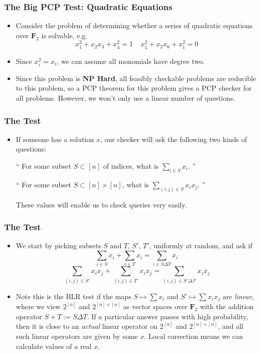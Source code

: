 \documentclass{beamer}
\begin{document}
\begin{frame}
    \frametitle{The Big PCP Test: Quadratic Equations}

    \begin{itemize}
        \item Consider the problem of determining whether a series of quadratic equations over $\mathbf{F}_2$ is solvable, e.g.
        \[ x_1^2 + x_2x_3 + x_4^2 = 1\ \ \ \ \ x_5^2 + x_2x_6 + x_1^2 = 0 \]

        \item Since $x_i^2 = x_i$, we can assume all monomials have degree two.

        \item Since this problem is {\bf NP Hard}, all feasibly checkable problems are reducible to this problem, so a PCP theorem for this problem gives a PCP checker for all problems. However, we won't only use a linear number of questions.
    \end{itemize}
\end{frame}

\begin{frame}
    \frametitle{The Test}

    \begin{itemize}
        \item If someone has a solution $x$, our checker will ask the following two kinds of questions:
        \begin{center} `` For some subset $S \subset [n]$ of indices, what is $\sum_{i \in S} x_i$. ''
        \end{center}
        \begin{center}
                `` For some subset $S \subset [n] \times [n]$, what is $\sum_{(i,j) \in S} x_ix_j$. ''
        \end{center}
        These values will enable us to check queries very easily.
    \end{itemize}
\end{frame}

\begin{frame}
    \frametitle{The Test}

    \begin{itemize}
            \item We start by picking subsets $S$ and $T$, $S'$, $T'$, uniformly at random, and ask if
        \[ \sum_{i \in S} x_i + \sum_{i \in T} x_i = \sum_{i \in S \Delta T} x_i \]
        \[ \sum_{(i,j) \in S'} x_ix_j + \sum_{(i,j) \in T'} x_ix_j = \sum_{(i,j) \in S' \Delta J'} x_ix_j \]

        \item Note this is the BLR test if the maps $S \mapsto \sum x_i$ and $S' \mapsto \sum x_ix_j$ are {\it linear}, where we view $2^{[n]}$ and $2^{[n] \times [n]}$ as vector spaces over $\mathbf{F}_2$ with the addition operator $S + T := S \Delta T$. If a particular answer passes with high probability, then it is close to an {\it actual} linear operator on $2^{[n]}$ and $2^{[n] \times [n]}$, and all such linear operators are given by some $x$. Local correction means we can calculate values of a real $x$.
    \end{itemize}
\end{frame}
\end{document}

